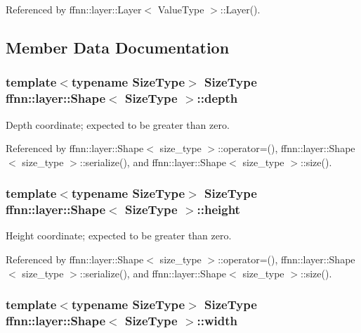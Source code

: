 Referenced by ffnn\-::layer\-::\-Layer$<$ Value\-Type $>$\-::\-Layer().



\subsection{Member Data Documentation}
\hypertarget{structffnn_1_1layer_1_1_shape_a37ec3deb8c9f2d6617e6f63799c0fcbf}{
\subsubsection[{depth}]{\setlength{\rightskip}{0pt plus 5cm}template$<$typename Size\-Type$>$ Size\-Type {\bf ffnn\-::layer\-::\-Shape}$<$ Size\-Type $>$\-::depth}}\label{structffnn_1_1layer_1_1_shape_a37ec3deb8c9f2d6617e6f63799c0fcbf}


Depth coordinate; expected to be greater than zero. 



Referenced by ffnn\-::layer\-::\-Shape$<$ size\-\_\-type $>$\-::operator=(), ffnn\-::layer\-::\-Shape$<$ size\-\_\-type $>$\-::serialize(), and ffnn\-::layer\-::\-Shape$<$ size\-\_\-type $>$\-::size().

\hypertarget{structffnn_1_1layer_1_1_shape_a96608d7bcef7733a1b1f4782827a0c78}{
\subsubsection[{height}]{\setlength{\rightskip}{0pt plus 5cm}template$<$typename Size\-Type$>$ Size\-Type {\bf ffnn\-::layer\-::\-Shape}$<$ Size\-Type $>$\-::height}}\label{structffnn_1_1layer_1_1_shape_a96608d7bcef7733a1b1f4782827a0c78}


Height coordinate; expected to be greater than zero. 



Referenced by ffnn\-::layer\-::\-Shape$<$ size\-\_\-type $>$\-::operator=(), ffnn\-::layer\-::\-Shape$<$ size\-\_\-type $>$\-::serialize(), and ffnn\-::layer\-::\-Shape$<$ size\-\_\-type $>$\-::size().

\hypertarget{structffnn_1_1layer_1_1_shape_a860cbac53d9e20bdf8283298c6369cbc}{
\subsubsection[{width}]{\setlength{\rightskip}{0pt plus 5cm}template$<$typename Size\-Type$>$ Size\-Type {\bf ffnn\-::layer\-::\-Shape}$<$ Size\-Type $>$\-::width}}\label{structffnn_1_1layer_1_1_shape_a860cbac53d9e20bdf8283298c6369cbc}


